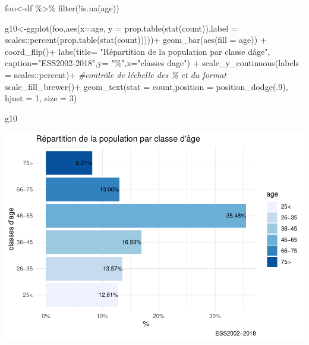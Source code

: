 \documentclass[
]{book}
\newenvironment{Shaded}{\begin{snugshade}}{\end{snugshade}}
\newcommand{\AttributeTok}[1]{\textcolor[rgb]{0.77,0.63,0.00}{#1}}
\newcommand{\CommentTok}[1]{\textcolor[rgb]{0.56,0.35,0.01}{\textit{#1}}}
\newcommand{\DecValTok}[1]{\textcolor[rgb]{0.00,0.00,0.81}{#1}}
\newcommand{\FunctionTok}[1]{\textcolor[rgb]{0.00,0.00,0.00}{#1}}
\newcommand{\NormalTok}[1]{#1}
\newcommand{\OtherTok}[1]{\textcolor[rgb]{0.56,0.35,0.01}{#1}}
\newcommand{\SpecialCharTok}[1]{\textcolor[rgb]{0.00,0.00,0.00}{#1}}
\newcommand{\StringTok}[1]{\textcolor[rgb]{0.31,0.60,0.02}{#1}}
\begin{document}
\begin{Shaded}
\begin{Highlighting}[]
\NormalTok{foo}\OtherTok{\textless{}{-}}\NormalTok{df }\SpecialCharTok{\%\textgreater{}\%}
  \FunctionTok{filter}\NormalTok{(}\SpecialCharTok{!}\FunctionTok{is.na}\NormalTok{(age))}

\NormalTok{g10}\OtherTok{\textless{}{-}}\FunctionTok{ggplot}\NormalTok{(foo,}\FunctionTok{aes}\NormalTok{(}\AttributeTok{x=}\NormalTok{age, }\AttributeTok{y =} \FunctionTok{prop.table}\NormalTok{(}\FunctionTok{stat}\NormalTok{(count)),}\AttributeTok{label =}\NormalTok{ scales}\SpecialCharTok{::}\FunctionTok{percent}\NormalTok{(}\FunctionTok{prop.table}\NormalTok{(}\FunctionTok{stat}\NormalTok{(count)))))}\SpecialCharTok{+}
  \FunctionTok{geom\_bar}\NormalTok{(}\FunctionTok{aes}\NormalTok{(}\AttributeTok{fill =}\NormalTok{ age)) }\SpecialCharTok{+}  
  \FunctionTok{coord\_flip}\NormalTok{()}\SpecialCharTok{+} 
  \FunctionTok{labs}\NormalTok{(}\AttributeTok{title=} \StringTok{"Répartition de la population par classe d\textquotesingle{}âge"}\NormalTok{, }\AttributeTok{caption=}\StringTok{"ESS2002{-}2018"}\NormalTok{,}\AttributeTok{y=} \StringTok{"\%"}\NormalTok{,}\AttributeTok{x=}\StringTok{"classes d\textquotesingle{}age"}\NormalTok{) }\SpecialCharTok{+}
  \FunctionTok{scale\_y\_continuous}\NormalTok{(}\AttributeTok{labels =}\NormalTok{ scales}\SpecialCharTok{::}\NormalTok{percent)}\SpecialCharTok{+} \CommentTok{\#contrôle de l\textquotesingle{}échelle des \% et du format}
  \FunctionTok{scale\_fill\_brewer}\NormalTok{()}\SpecialCharTok{+}
  \FunctionTok{geom\_text}\NormalTok{(}\AttributeTok{stat =} \StringTok{\textquotesingle{}count\textquotesingle{}}\NormalTok{,}\AttributeTok{position =} \FunctionTok{position\_dodge}\NormalTok{(.}\DecValTok{9}\NormalTok{),  }\AttributeTok{hjust =} \DecValTok{1}\NormalTok{, }\AttributeTok{size =} \DecValTok{3}\NormalTok{)}


\NormalTok{g10}
\end{Highlighting}
\end{Shaded}

\includegraphics{bookdown-demo_files/figure-latex/309-1.pdf}
\end{document}
